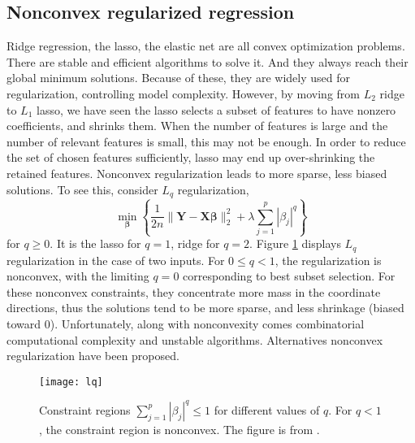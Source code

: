 \subsection{Nonconvex regularized regression}
Ridge regression, the lasso, the elastic net are all convex optimization problems. There are stable and efficient algorithms to solve it. And they always reach their global minimum solutions. Because of these, they are widely used for regularization, controlling model complexity. However, by moving from $L_2$ ridge to $L_1$ lasso, we have seen the lasso selects a subset of features to have nonzero coefficients, and shrinks them. When the number of features is large and the number of relevant features is small, this may not be enough. In order to reduce the set of chosen features sufficiently, lasso may end up over-shrinking the retained features. Nonconvex regularization leads to more sparse, less biased solutions. To see this, consider $L_q$ regularization,
\begin{equation}
    \min_{\bm{\beta}} \left\{ \frac{1}{2n}\|\bm{Y} - \bm{X\beta}\|_2^2 + \lambda \sum_{j=1}^{p}|\beta_j|^q \right\} \label{eq1.15}
\end{equation}
for $q\geq0$. It is the lasso for $q=1$, ridge for $q=2$. Figure \ref{fig:lq} displays $L_q$ regularization in the case of two inputs. For $0 \leq q <1$, the regularization is nonconvex, with the limiting $q=0$ corresponding to best subset selection. For these nonconvex constraints, they concentrate more mass in the coordinate directions, thus the solutions tend to be more sparse, and less shrinkage (biased toward 0). Unfortunately, along with nonconvexity comes combinatorial computational complexity and unstable algorithms. Alternatives nonconvex regularization have been proposed.
\begin{figure}[tbh]
  \centering
  \texttt{[image: lq]}
  \caption[Constraint regions $\sum_{j=1}^p|\beta_j|^q\leq1$ for different values of $q$] {
    Constraint regions $\sum_{j=1}^p|\beta_j|^q\leq1$ for different values of $q$. For $q<1$, the constraint region is nonconvex. The figure is from \cite{hastie2009elements}. 
  }
  \label{fig:lq}
\end{figure}

